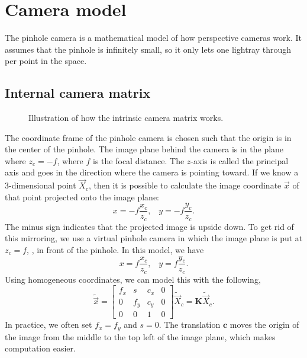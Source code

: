 \section{Camera model} \label{sec:camera-model}

The pinhole camera is a mathematical model of how perspective cameras work.
It assumes that the pinhole is infinitely small, so it only lets one lightray
through per point in the space.

\subsection{Internal camera matrix}

\begin{figure}[ht]
    \centering
    \caption{Illustration of how the intrinsic camera matrix works.}
    \label{fig:internal-camera}
\end{figure}

The coordinate frame of the pinhole camera is chosen such that the origin is in
the center of the pinhole. The image plane behind the camera is in the plane
where $z_c=-f$, where $f$ is the focal distance. The $z$-axis is called the
principal axis and goes in the direction where the camera is pointing toward. If
we know a 3-dimensional point $\vec{X}_c$, then it is possible to calculate
the image coordinate $\vec{x}$ of that point projected onto the image plane: \[
  x=-f\frac{x_c}{z_c}, \;\;\; y=-f\frac{y_c}{z_c}
.\]
The minus sign indicates that the projected image is upside down. To get rid of
this mirroring, we use a virtual pinhole camera in which the image plane is put
at $z_c=f$, \ie, in front of the pinhole. In this model, we have \[
  x=f\frac{x_c}{z_c}, \;\;\; y=f\frac{y_c}{z_c}
.\]
Using homogeneous coordinates, we can model this with the following, \[
  \tilde{\vec{x}} = \begin{bmatrix} f_x & s & c_x & 0 \\ 0 & f_y & c_y & 0 \\ 0
  & 0 & 1 & 0 \end{bmatrix}\tilde{\vec{X}}_c = \bm{K}\tilde{\vec{X}}_c
.\]
In practice, we often set $f_x=f_y$ and $s=0$. The translation $\bm{c}$ moves
the origin of the image from the middle to the top left of the image plane,
which makes computation easier.

